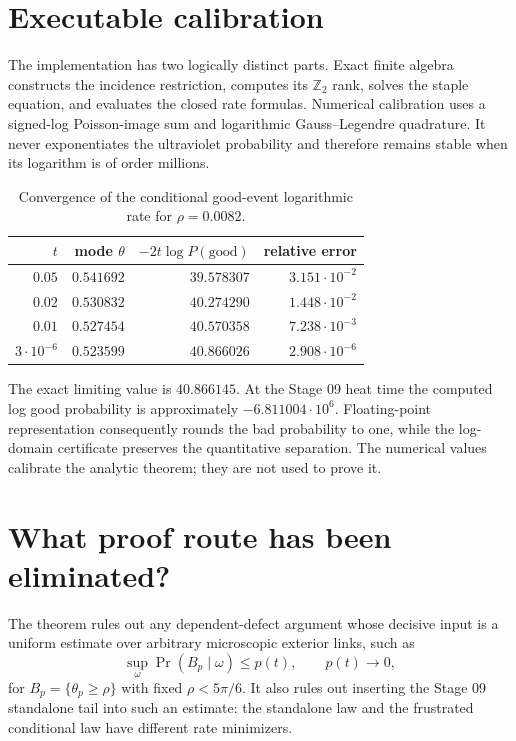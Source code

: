 \documentclass[11pt]{article}
\theoremstyle{definition}
\newcommand{\Ztwo}{\mathbb Z_2}
\begin{document}
\section{Executable calibration}

The implementation has two logically distinct parts.  Exact finite algebra
constructs the incidence restriction, computes its $\Ztwo$ rank, solves the
staple equation, and evaluates the closed rate formulas.  Numerical
calibration uses a signed-log Poisson-image sum and logarithmic
Gauss--Legendre quadrature.  It never exponentiates the ultraviolet
probability and therefore remains stable when its logarithm is of order
millions.

\begin{table}[ht]
\centering
\caption{Convergence of the conditional good-event logarithmic rate for
$\rho=0.0082$.}\label{tab:rates}
\begin{tabular}{@{}rrrr@{}}
\toprule
$t$ & mode $\theta$ & $-2t\log P(\mathrm{good})$ & relative error \\
\midrule
$0.05$ & $0.541692$ & $39.578307$ & $3.151\cdot10^{-2}$ \\
$0.02$ & $0.530832$ & $40.274290$ & $1.448\cdot10^{-2}$ \\
$0.01$ & $0.527454$ & $40.570358$ & $7.238\cdot10^{-3}$ \\
$3\cdot10^{-6}$ & $0.523599$ & $40.866026$ & $2.908\cdot10^{-6}$ \\
\bottomrule
\end{tabular}
\end{table}

The exact limiting value is $40.866145$.  At the Stage 09 heat time the
computed log good probability is approximately $-6.811004\cdot10^6$.
Floating-point representation consequently rounds the bad probability to
one, while the log-domain certificate preserves the quantitative separation.
The numerical values calibrate the analytic theorem; they are not used to
prove it.

\section{What proof route has been eliminated?}

The theorem rules out any dependent-defect argument whose decisive input is a
uniform estimate over arbitrary microscopic exterior links, such as
\[
 \sup_{\omega}\Pr(B_p\mid\omega)\le p(t),
 \qquad p(t)\longrightarrow0,
\]
for $B_p=\{\theta_p\ge\rho\}$ with fixed
$\rho<5\pi/6$.  It also rules out inserting the Stage 09 standalone tail into
such an estimate: the standalone law and the frustrated conditional law have
different rate minimizers.
\end{document}
